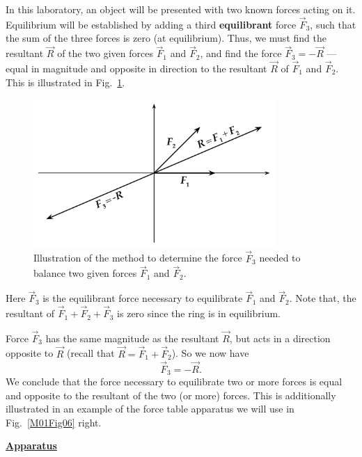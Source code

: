 In this laboratory, an object will be presented with two known forces acting on it.  Equilibrium will be established by adding a third \textbf{equilibrant} force $\vec{F}_3$, such that the sum of the three forces is zero (at equilibrium). Thus, we must find the resultant $\vec{R}$ of the two given forces $\vec{F}_1$ and $\vec{F}_2$, and find the force $\vec{F}_3 = -\vec{R}$ --- equal in magnitude and opposite in direction to the resultant $\vec{R}$ of $\vec{F}_1$ and $\vec{F}_2$.  This is illustrated in Fig.~\ref{M01Fig05}.


\begin{figure}[h]
  \begin{center}
    \includegraphics[width=3.6in]{Experiment01Figures/Figure05.pdf}
  \end{center}
  \caption{Illustration of the method to determine the force $\vec{F}_{3}$ needed to balance two given forces $\vec{F}_{1}$ and $\vec{F}_{2}$.}
  \label{M01Fig05}
\end{figure}

Here $\vec{F}_3$ is the equilibrant force necessary to equilibrate $\vec{F}_1$ and $\vec{F}_2$.  Note that, the resultant of $\vec{F}_1+\vec{F}_2+\vec{F}_3$ is zero since the ring is in equilibrium.

Force $\vec{F}_3$ has the same magnitude as the resultant $\vec{R}$, but acts in a direction opposite to $\vec{R}$ (recall that $\vec{R}=\vec{F}_1+\vec{F}_2$).  So we now have
\begin{equation}
  \vec{F}_3 = -\vec{R}.
\end{equation}
We conclude that the force necessary to equilibrate two or more forces is equal and opposite to the resultant of the two (or more) forces. This is additionally illustrated in an example of the force table apparatus we will use in Fig.~\ref{M01Fig06} right.





\underline{\textbf{Apparatus}}


